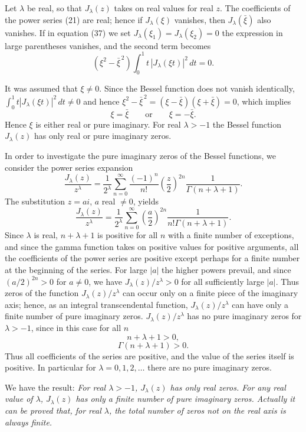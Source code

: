Let $\lambda$ be real, so that $J_\lambda(z)$ takes on real values for real $z$. The coefficients of the power series (21) are real; hence if $J_\lambda(\xi)$ vanishes, then $J_\lambda(\bar\xi)$ also vanishes. If in equation (37) we set $J_\lambda(\xi_1)=J_\lambda(\xi_2)=0$ the expression in large parentheses vanishes, and the second term becomes
\[
(\xi^2-\bar\xi^{\,2})\int_0^1t\,|J_\lambda(\xi t)|^2\,dt=0.
\]

It was assumed that $\xi\ne0$. Since the Bessel function does not vanish identically,\linebreak[1] $\int_0^1t|J_\lambda(\xi t)|^2\,dt\ne0$ and hence $\xi^2-\bar\xi^{\,2}=(\xi-\bar\xi)(\xi+\bar\xi)=0$, which implies
\[
\xi=\bar\xi\qquad\text{or}\qquad \xi=-\bar\xi.
\]
Hence $\xi$ is either real or pure imaginary. For real $\lambda>-1$ the Bessel function $J_\lambda(z)$ has only real or pure imaginary zeros.

In order to investigate the pure imaginary zeros of the Bessel functions, we consider the power series expansion
\[
\frac{J_\lambda(z)}{z^\lambda}=\frac1{2^\lambda}\sum_{n=0}^{\infty}
\frac{(-1)^n}{n!}\left(\frac z2\right)^{2n}\frac1{\Gamma(n+\lambda+1)}.
\]
The substitution $z=ai$, $a$ real $\ne0$, yields
\[
\frac{J_\lambda(z)}{z^\lambda}=\frac1{2^\lambda}\sum_{n=0}^{\infty}
\left(\frac a2\right)^{2n}\frac1{n!\Gamma(n+\lambda+1)}.
\]
Since $\lambda$ is real, $n+\lambda+1$ is positive for all $n$ with a finite number of exceptions, and since the gamma function takes on positive values for positive arguments, all the coefficients of the power series are positive except perhaps for a finite number at the beginning of the series. For large $|a|$ the higher powers prevail, and since $(a/2)^{2n}>0$ for $a\ne0$, we have $J_\lambda(z)/z^\lambda>0$ for all sufficiently large $|a|$. Thus zeros of the function $J_\lambda(z)/z^\lambda$ can occur only on a finite piece of the imaginary axis; hence, as an integral transcendental function, $J_\lambda(z)/z^\lambda$ can have only a finite number of pure imaginary zeros. $J_\lambda(z)/z^\lambda$ has no pure imaginary zeros for $\lambda>-1$, since in this case for all $n$
\[
n+\lambda+1>0,
\]
\[
\Gamma(n+\lambda+1)>0.
\]
Thus all coefficients of the series are positive, and the value of the series itself is positive. In particular for $\lambda=0,1,2,\ldots$ there are no pure imaginary zeros.

We have the result: \emph{For real $\lambda>-1$, $J_\lambda(z)$ has only real zeros. For any real value of $\lambda$, $J_\lambda(z)$ has only a finite number of pure imaginary zeros. Actually it can be proved that, for real $\lambda$, the total number of zeros not on the real axis is always finite.}

